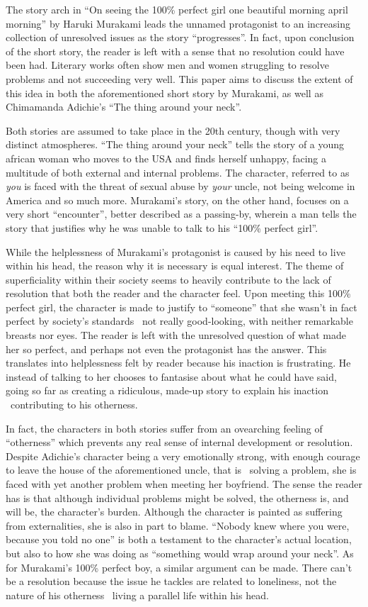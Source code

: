 \documentclass{article}
\begin{document}
The story arch in ``On seeing the 100\% perfect girl one beautiful morning april morning'' by Haruki Murakami leads the unnamed protagonist to an increasing collection of unresolved issues as the story ``progresses''. In fact, upon conclusion of the short story, the reader is left with a sense that no resolution could have been had. Literary works often show men and women struggling to resolve problems and not succeeding very well. This paper aims to discuss the extent of this idea in both the aforementioned short story by Murakami, as well as Chimamanda Adichie's ``The thing around your neck''.

Both stories are assumed to take place in the 20th century, though with very distinct atmospheres. ``The thing around your neck'' tells the story of a young african woman who moves to the USA and finds herself unhappy, facing a multitude of both external and internal problems. The character, referred to as \textit{you} is faced with the threat of sexual abuse by \textit{your} uncle, not being welcome in America and so much more. Murakami's story, on the other hand, focuses on a very short ``encounter'', better described as a passing-by, wherein a man tells the story that justifies why he was unable to talk to his ``100\% perfect girl''.

While the helplessness of Murakami's protagonist is caused by his need to live within his head, the reason why it is necessary is equal interest. The theme of superficiality within their society seems to heavily contribute to the lack of resolution that both the reader and the character feel. Upon meeting this 100\% perfect girl, the character is made to justify to ``someone'' that she wasn't in fact perfect by society's standards \textendash\ not really good-looking, with neither remarkable breasts nor eyes. The reader is left with the unresolved question of what made her so perfect, and perhaps not even the protagonist has the answer. This translates into helplessness felt by reader because his inaction is frustrating. He instead of talking to her chooses to fantasise about what he could have said, going so far as creating a ridiculous, made-up story to explain his inaction \textendash\ contributing to his otherness.

In fact, the characters in both stories suffer from an ovearching feeling of ``otherness'' which prevents any real sense of internal development or resolution. Despite Adichie's character being a very emotionally strong, with enough courage to leave the house of the aforementioned uncle, that is \textendash\ solving a problem, she is faced with yet another problem when meeting her boyfriend. The sense the reader has is that although individual problems might be solved, the otherness is, and will be, the character's burden. Although the character is painted as suffering from externalities, she is also in part to blame. ``Nobody knew where you were, because you told no one'' is both a testament to the character's actual location, but also to how she was doing as ``something would wrap around your neck''. As for Murakami's 100\% perfect boy, a similar argument can be made. There can't be a resolution because the issue he tackles are related to loneliness, not the nature of his otherness \textendash\ living a parallel life within his head.
\end{document}
